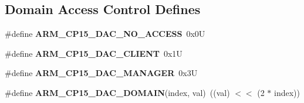 \subsection*{Domain Access Control Defines}
\begin{DoxyCompactItemize}
\item 
\mbox{\label{group__RTEMSScoreCPUARMCP15_ga8a13703fbaa71bd57e394131e4004f9d}} 
\#define {\bfseries A\+R\+M\+\_\+\+C\+P15\+\_\+\+D\+A\+C\+\_\+\+N\+O\+\_\+\+A\+C\+C\+E\+SS}~0x0U
\item 
\mbox{\label{group__RTEMSScoreCPUARMCP15_ga5a0d8e5bf950d822fc7384eb9738642c}} 
\#define {\bfseries A\+R\+M\+\_\+\+C\+P15\+\_\+\+D\+A\+C\+\_\+\+C\+L\+I\+E\+NT}~0x1U
\item 
\mbox{\label{group__RTEMSScoreCPUARMCP15_gae41603e54450ab86a3de19245b301004}} 
\#define {\bfseries A\+R\+M\+\_\+\+C\+P15\+\_\+\+D\+A\+C\+\_\+\+M\+A\+N\+A\+G\+ER}~0x3U
\item 
\mbox{\label{group__RTEMSScoreCPUARMCP15_ga7316eee430b26658ae3bd11da996a4d3}} 
\#define {\bfseries A\+R\+M\+\_\+\+C\+P15\+\_\+\+D\+A\+C\+\_\+\+D\+O\+M\+A\+IN}(index,  val)~((val) $<$$<$ (2 $\ast$ index))
\end{DoxyCompactItemize}
